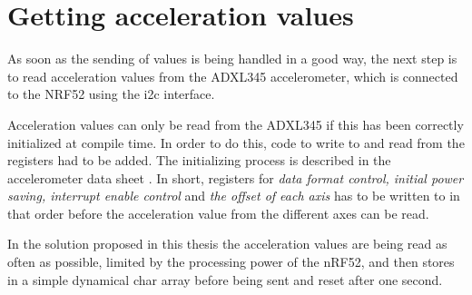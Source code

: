 \section{Getting acceleration values}

As soon as the sending of values is being handled in a good way, the next step is to read acceleration values from the ADXL345 accelerometer, which is connected to the NRF52 using the \gls{i2c} interface. 

Acceleration values can only be read from the ADXL345 if this has been correctly initialized at compile time. In order to do this, code to write to and read from the registers had to be added. The initializing process is described in the accelerometer data sheet \cite{adxlDataSheet}. In short, registers for \textit{data format control, initial power saving, interrupt enable control} and \textit{the offset of each axis} has to be written to in that order before the acceleration value from the different axes can be read.  

In the solution proposed in this thesis the acceleration values are being read as often as possible, limited by the processing power of the nRF52, and then stores in a simple dynamical char array before being sent and reset after one second. 




